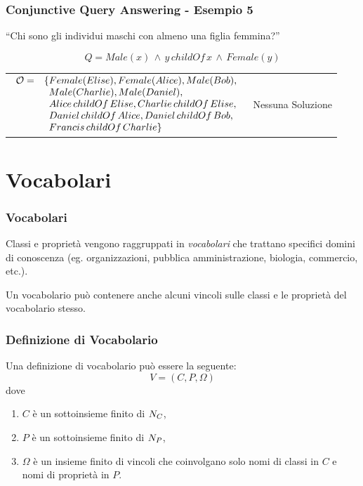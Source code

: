 \documentclass[8pt]{beamer}
\begin{document}
\begin{frame}
\frametitle{Conjunctive Query Answering - Esempio 5}
\begin{center}
``Chi sono gli individui maschi con almeno una figlia femmina?''
\end{center}
\[
 Q=Male(x)\,\wedge\,y\,childOf\,x\,\wedge\,Female(y)
\]
\vspace{\baselineskip}

\begin{tabular}{lc}
$\begin{array}{cl}
  \Ont  =  &  \{Female(Elise), Female(Alice), Male(Bob), \\
  &\phantom{\{}Male(Charlie), Male(Daniel), \\
  &\phantom{\{}Alice\,childOf\,Elise, Charlie\,childOf\,Elise, \\
  &\phantom{\{}Daniel\,childOf\,Alice, Daniel\,childOf\,Bob, \\
  &\phantom{\{}Francis\,childOf\,Charlie \}\\
\end{array}$ & Nessuna Soluzione\\
\end{tabular}
\end{frame}

\section{Vocabolari}
\begin{frame}
\frametitle{Vocabolari}
Classi e propriet\`a vengono raggruppati in \emph{vocabolari}
che trattano specifici domini di conoscenza (eg. organizzazioni, 
pubblica amministrazione, biologia, commercio, etc.). 
\vspace{\baselineskip}

Un vocabolario
pu\`o contenere anche alcuni vincoli sulle classi e le propriet\`a 
del vocabolario stesso.
\vspace{\baselineskip}

\end{frame}

\begin{frame}
\frametitle{Definizione di Vocabolario}
Una definizione di vocabolario pu\`o essere la seguente:
\[
 V = (C, P, \Omega)
\]
dove
\begin{enumerate}
 \item $C$ \`e un sottoinsieme finito di $N_C$,
 \item $P$ \`e un sottoinsieme finito di $N_P$,
 \item $\Omega$ \`e un insieme finito di vincoli che coinvolgano solo
 nomi di classi in $C$ e nomi di propriet\`a in $P$.
\end{enumerate}
\end{frame}
\end{document}
